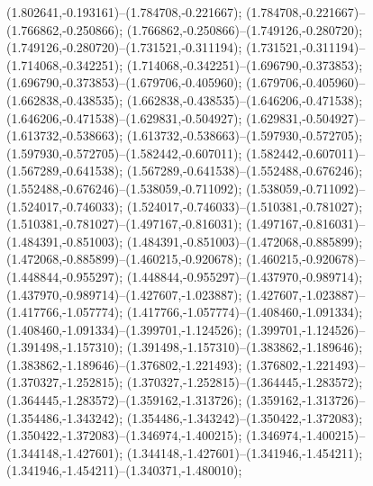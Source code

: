 (1.802641,-0.193161)--(1.784708,-0.221667);
 (1.784708,-0.221667)--(1.766862,-0.250866);
 (1.766862,-0.250866)--(1.749126,-0.280720);
 (1.749126,-0.280720)--(1.731521,-0.311194);
 (1.731521,-0.311194)--(1.714068,-0.342251);
 (1.714068,-0.342251)--(1.696790,-0.373853);
 (1.696790,-0.373853)--(1.679706,-0.405960);
 (1.679706,-0.405960)--(1.662838,-0.438535);
 (1.662838,-0.438535)--(1.646206,-0.471538);
 (1.646206,-0.471538)--(1.629831,-0.504927);
 (1.629831,-0.504927)--(1.613732,-0.538663);
 (1.613732,-0.538663)--(1.597930,-0.572705);
 (1.597930,-0.572705)--(1.582442,-0.607011);
 (1.582442,-0.607011)--(1.567289,-0.641538);
 (1.567289,-0.641538)--(1.552488,-0.676246);
 (1.552488,-0.676246)--(1.538059,-0.711092);
 (1.538059,-0.711092)--(1.524017,-0.746033);
 (1.524017,-0.746033)--(1.510381,-0.781027);
 (1.510381,-0.781027)--(1.497167,-0.816031);
 (1.497167,-0.816031)--(1.484391,-0.851003);
 (1.484391,-0.851003)--(1.472068,-0.885899);
 (1.472068,-0.885899)--(1.460215,-0.920678);
 (1.460215,-0.920678)--(1.448844,-0.955297);
 (1.448844,-0.955297)--(1.437970,-0.989714);
 (1.437970,-0.989714)--(1.427607,-1.023887);
 (1.427607,-1.023887)--(1.417766,-1.057774);
 (1.417766,-1.057774)--(1.408460,-1.091334);
 (1.408460,-1.091334)--(1.399701,-1.124526);
 (1.399701,-1.124526)--(1.391498,-1.157310);
 (1.391498,-1.157310)--(1.383862,-1.189646);
 (1.383862,-1.189646)--(1.376802,-1.221493);
 (1.376802,-1.221493)--(1.370327,-1.252815);
 (1.370327,-1.252815)--(1.364445,-1.283572);
 (1.364445,-1.283572)--(1.359162,-1.313726);
 (1.359162,-1.313726)--(1.354486,-1.343242);
 (1.354486,-1.343242)--(1.350422,-1.372083);
 (1.350422,-1.372083)--(1.346974,-1.400215);
 (1.346974,-1.400215)--(1.344148,-1.427601);
 (1.344148,-1.427601)--(1.341946,-1.454211);
 (1.341946,-1.454211)--(1.340371,-1.480010);
